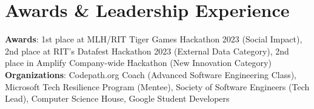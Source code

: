 \documentclass[letterpaper,11pt]{article}
\begin{document}
\section{Awards \& Leadership Experience}
 \begin{itemize}[leftmargin=0.15in, label={}]
    \small{\item{
      \textbf{Awards}{: 1st place at MLH/RIT Tiger Games Hackathon 2023 (Social Impact), 2nd place at RIT's Datafest Hackathon 2023 (External Data Category), 2nd place in Amplify Company-wide Hackathon (New Innovation Category)
} \\
    \textbf{Organizations}{: Codepath.org Coach (Advanced Software Engineering Class), Microsoft Tech Resilience Program (Mentee), Society of Software Engineers (Tech Lead), Computer Science House, Google Student Developers
} \\
    }}
 \end{itemize}
\end{document}
